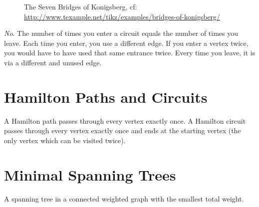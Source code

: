 \begin{figure}[!hbt]
\label{fig:SevenBridgesKonigsberg}
  \caption{The Seven Bridges of Konigsberg, cf:
  \url{http://www.texample.net/tikz/examples/bridges-of-konigsberg/}}
\end{figure}

\emph{No}. The number of times you enter a circuit equals the number of times
you leave. Each time you enter, you use a different edge. If you enter a vertex
twice, you would have to have used that same entrance twice. Every time you
leave, it is via a different and unused edge.

\section{Hamilton Paths and Circuits}
A Hamilton path passes through every vertex exactly once. A Hamilton circuit
passes through every vertex exactly once and ends at the starting vertex (the
only vertex which can be visited twice).

\section{Minimal Spanning Trees}
A spanning tree in a connected weighted graph with the smallest total weight.

